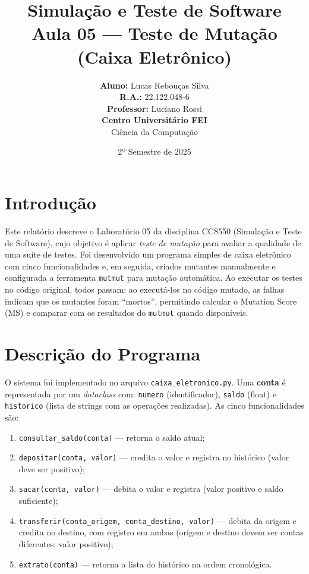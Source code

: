 \documentclass[11pt,a4paper]{article}
\title{
    {\Large \textbf{Simulação e Teste de Software}} \\
    {\Large \textbf{Aula 05 --- Teste de Mutação (Caixa Eletrônico)}}
}
\author{
    \textbf{Aluno:} Lucas Rebouças Silva \\
    \textbf{R.A.:} 22.122.048-6 \\[0.3cm]
    \textbf{Professor:} Luciano Rossi \\
    \textbf{Centro Universitário FEI} \\
    Ciência da Computação
}
\date{2º Semestre de 2025}
\begin{document}
\maketitle

\newpage
\tableofcontents
\newpage

\section{Introdução}

Este relatório descreve o Laboratório 05 da disciplina CC8550 (Simulação e Teste de Software), cujo objetivo é aplicar \emph{teste de mutação} para avaliar a qualidade de uma suíte de testes. Foi desenvolvido um programa simples de caixa eletrônico com cinco funcionalidades e, em seguida, criados mutantes manualmente e configurada a ferramenta \texttt{mutmut} para mutação automática. Ao executar os testes no código original, todos passam; ao executá-los no código mutado, as falhas indicam que os mutantes foram ``mortos'', permitindo calcular o Mutation Score (MS) e comparar com os resultados do \texttt{mutmut} quando disponíveis.

\section{Descrição do Programa}

O sistema foi implementado no arquivo \texttt{caixa\_eletronico.py}. Uma \textbf{conta} é representada por um \emph{dataclass} com: \texttt{numero} (identificador), \texttt{saldo} (float) e \texttt{historico} (lista de strings com as operações realizadas). As cinco funcionalidades são:

\begin{enumerate}
  \item \texttt{consultar\_saldo(conta)} --- retorna o saldo atual;
  \item \texttt{depositar(conta, valor)} --- credita o valor e registra no histórico (valor deve ser positivo);
  \item \texttt{sacar(conta, valor)} --- debita o valor e registra (valor positivo e saldo suficiente);
  \item \texttt{transferir(conta\_origem, conta\_destino, valor)} --- debita da origem e credita no destino, com registro em ambas (origem e destino devem ser contas diferentes; valor positivo);
  \item \texttt{extrato(conta)} --- retorna a lista do histórico na ordem cronológica.
\end{enumerate}
\end{document}
